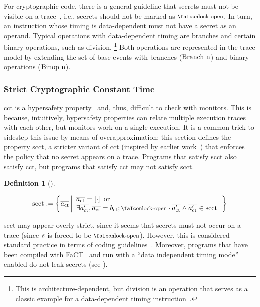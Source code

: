 \documentclass[dvipsnames,conference]{IEEEtran}
\theoremstyle{definition}
\newtheorem{definition}{Definition}[section]
\begin{document}
For cryptographic code, there is a general guideline that secrets must not be visible on a trace~\cite{ctguidelines}, i.e., secrets should not be marked as $\unlock$.
In turn, an instruction whose timing is data-dependent must not have a secret as an operand.
Typical operations with data-dependent timing are branches and certain binary operations, such as division.%
\footnote{
	This is architecture-dependent, but division is an operation that serves as a classic example for a data-dependent timing instruction~\cite[p.~755]{arm-refman}.
}
Both operations are represented in the trace model by extending the set of base-events with branches ($\text{Branch\ n}$) and binary operations ($\text{Binop\ n}$).

\subsubsection{Strict Cryptographic Constant Time}

\gls*{cct} is a hypersafety property~\cite{barthe2018sec} and, thus, difficult to check with monitors.
This is because, intuitively, hypersafety properties can relate multiple execution traces with each other, but monitors work on a single execution.
It is a common trick to sidestep this issue by means of overapproximation: this section defines the property \gls*{scct}, a stricter variant of \gls*{cct} (inspired by earlier work~\cite{almeida2017jasmin}) that enforces the policy that no secret appears on a trace.
Programs that satisfy \gls*{scct} also satisfy \gls*{cct}, but programs that satisfy \gls*{cct} may not satisfy \gls*{scct}.

\begin{definition}[]\label{def:trace:scctdef}
  
  \noindent\[
  \scctsafe:=\left\{\trace[_{\ctsafe}] \left|\begin{array}{l}
      \trace[_{\ctsafe}]=\hole{\cdot} \text{ or } \\\exists\trace[_{\ctsafe}'],\trace[_{\ctsafe}]=\preevent[_{\ctsafe}];\unlock\cdot\trace[_{\ctsafe}'] \wedge \trace[_{\ctsafe}']\in\scctsafe
    \end{array}\right.\right\}
  \]
\end{definition}

\gls*{scct} may appear overly strict, since it seems that secrets must not occur on a trace (since $s{}$ is forced to be $\unlock$). 
However, this is considered standard practice in terms of coding guidelines~\cite{ctguidelines}.
Moreover, programs that have been compiled with FaCT~\cite{cauligi2019fact} and run with a ``data independent timing mode''~\cite{arm-refman,intel-refman} enabled do not leak secrets (see ). 
\end{document}
